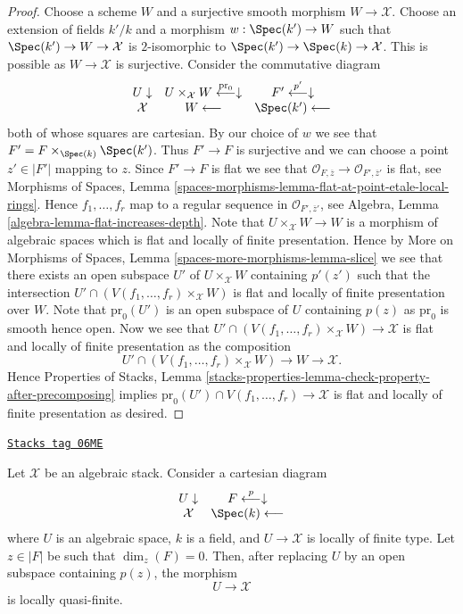 \begin{proof}
Choose a scheme $W$ and a surjective smooth morphism $W \to \mathcal{X}$.
Choose an extension of fields $k'/k$ and a morphism
$w : \Spec(k') \to W$ such that $\Spec(k') \to W \to \mathcal{X}$
is $2$-isomorphic to $\Spec(k') \to \Spec(k) \to \mathcal{X}$.
This is possible as $W \to \mathcal{X}$ is surjective.
Consider the commutative diagram
$$
\begin{array}{ccc}U \downarrow & U \times_\mathcal{X} W \overset{\text{pr}_0}{\longleftarrow}\downarrow & F' \overset{p'}{\longleftarrow}\downarrow \\ \mathcal{X} & W \longleftarrow & \Spec(k') \longleftarrow\end{array}
$$
both of whose squares are cartesian. By our choice of $w$ we see that
$F' = F \times_{\Spec(k)} \Spec(k')$. Thus $F' \to F$ is
surjective and we can choose a point $z' \in |F'|$ mapping to $z$.
Since $F' \to F$ is flat we see that
$\mathcal{O}_{F, \overline{z}} \to \mathcal{O}_{F', \overline{z}'}$ is
flat, see
Morphisms of Spaces,
Lemma \ref{spaces-morphisms-lemma-flat-at-point-etale-local-rings}.
Hence $f_1, \ldots, f_r$ map to a regular sequence in
$\mathcal{O}_{F', \overline{z}'}$, see
Algebra, Lemma \ref{algebra-lemma-flat-increases-depth}.
Note that $U \times_\mathcal{X} W \to W$ is a morphism of algebraic spaces
which is flat and locally of finite presentation. Hence by
More on Morphisms of Spaces, Lemma \ref{spaces-more-morphisms-lemma-slice}
we see that there exists an open subspace $U'$ of $U \times_\mathcal{X} W$
containing $p'(z')$ such that the intersection
$U' \cap (V(f_1, \ldots, f_r) \times_\mathcal{X} W)$ is flat and locally
of finite presentation over $W$. Note that
$\text{pr}_0(U')$ is an open subspace of $U$ containing $p(z)$
as $\text{pr}_0$ is smooth hence open. Now we see that
$U' \cap (V(f_1, \ldots, f_r) \times_\mathcal{X} W) \to \mathcal{X}$
is flat and locally of finite presentation as the composition
$$
U' \cap (V(f_1, \ldots, f_r) \times_\mathcal{X} W) \to W \to \mathcal{X}.
$$
Hence
Properties of Stacks,
Lemma \ref{stacks-properties-lemma-check-property-after-precomposing}
implies $\text{pr}_0(U') \cap V(f_1, \ldots, f_r) \to \mathcal{X}$
is flat and locally of finite presentation as desired.
\end{proof}

\begin{lemma}
\label{stacks-morphisms-lemma-quasi-finite-at-point}
\href{https://stacks.math.columbia.edu/tag/06ME}{\texttt{Stacks tag 06ME}}

Let $\mathcal{X}$ be an algebraic stack. Consider a cartesian diagram
$$
\begin{array}{cc}U \downarrow & F \overset{p}{\longleftarrow}\downarrow \\ \mathcal{X} & \Spec(k) \longleftarrow\end{array}
$$
where $U$ is an algebraic space, $k$ is a field, and $U \to \mathcal{X}$
is locally of finite type. Let $z \in |F|$ be such that $\dim_z(F) = 0$.
Then, after replacing $U$ by an open subspace containing $p(z)$, the morphism
$$
U \longrightarrow \mathcal{X}
$$
is locally quasi-finite.
\end{lemma}

